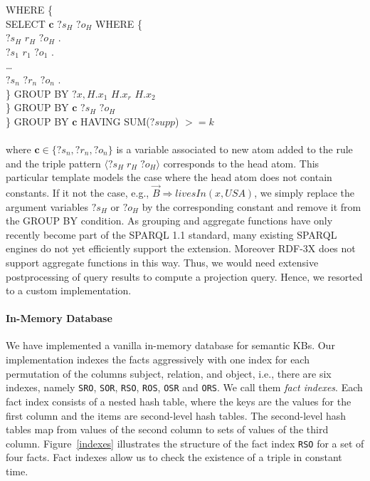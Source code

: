 {{ \hspace*{4ex} WHERE \{ \\
 \hspace*{6ex} SELECT $\bm{c}$ $?s_H$ $?o_H$ WHERE \{ \\
 \hspace*{6ex} $?s_H$ $r_H$ $?o_H$ . \\
 \hspace*{6ex} $?s_1$ $r_1$ $?o_1$ . \\
 \hspace*{6ex} \dots \\
 \hspace*{6ex} $?s_n$ $?r_n$ $?o_n$ . \\
 \hspace*{6ex} \} GROUP BY $?x, H.x_1$ $H.x_r$ $H.x_2$ \\
 \hspace*{4ex}\} GROUP BY $\bm{c}$ $?s_H$ $?o_H$ \\
 \} GROUP BY $\bm{c}$ HAVING SUM($?supp$) $ >= k$ \\
} \\
\noindent where $\bm{c} \in \{ ?s_n, ?r_n, ?o_n \}$ is a variable associated to new atom added to the rule
and the triple pattern $\langle ?s_H \; r_H \; ?o_H \rangle$ corresponds to the head atom. This particular template models the case
where the head atom does not contain constants. If it not the case, e.g., $\vec{B} \Rightarrow livesIn(x, USA)$, 
we simply replace the argument variables $?s_H$ or $?o_H$ by the corresponding constant and remove it from the GROUP BY condition.  
As grouping and aggregate functions have only recently become part of the SPARQL 1.1 standard, 
many existing SPARQL engines do not yet efficiently support the extension. Moreover 
RDF-3X does not support aggregate functions in this way. 
Thus, we would need extensive postprocessing of query results to compute a projection query.
Hence, we resorted to a custom implementation.

\paragraph{In-Memory Database} We have implemented a vanilla in-memory database for semantic KBs.
Our implementation indexes the facts aggressively with one index for each permutation of 
the columns subject, relation, and object, i.e., there are six indexes, namely \texttt{SRO}, \texttt{SOR}, 
\texttt{RSO}, \texttt{ROS}, \texttt{OSR} and \texttt{ORS}. We call them \emph{fact indexes}.
Each fact index consists of a nested hash table, where the keys are the values for the first column and the items
are second-level hash tables. The second-level hash tables map from values of the second column
to sets of values of the third column. 
Figure~\ref{indexes} illustrates the structure of the fact index \texttt{RSO} for a set of four facts.
Fact indexes allow us to check the existence of a triple in constant time.

}
